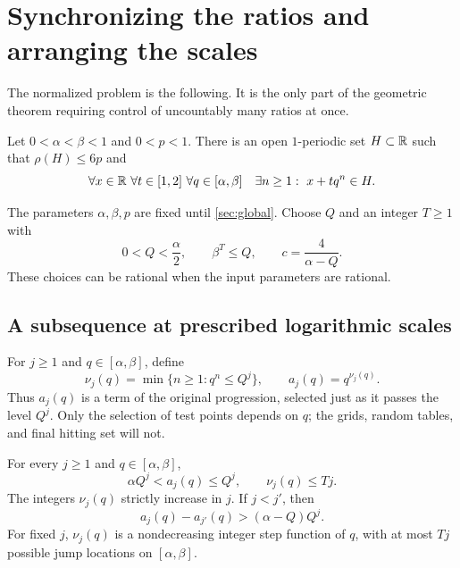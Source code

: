 \section{Synchronizing the ratios and arranging the scales}
\label{sec:synchronization}

The normalized problem is the following. It is the only part of the
geometric theorem requiring control of uncountably many ratios at once.

\begin{proposition}\label{prop:normalized}
Let $0<\alpha<\beta<1$ and $0<p<1$. There is an open $1$-periodic
set $H\subset\mathbb R$ such that $\rho(H)\le6p$ and
\begin{equation}\label{eq:normalized-hit}
 \forall x\in\mathbb R\ \forall t\in[1,2]\ \forall q\in[\alpha,\beta]
 \quad \exists n\ge1:\ x+tq^n\in H.
\end{equation}
\end{proposition}

The parameters $\alpha,\beta,p$ are fixed until \cref{sec:global}.
Choose $Q$ and an integer $T\ge1$ with
\begin{equation}\label{eq:Q-T}
 0<Q<\frac\alpha2,\qquad \beta^T\le Q,
 \qquad c=\frac4{\alpha-Q}.
\end{equation}
These choices can be rational when the input parameters are rational.

\subsection{A subsequence at prescribed logarithmic scales}

For $j\ge1$ and $q\in[\alpha,\beta]$, define
\begin{equation}\label{eq:nu}
 \nu_j(q)=\min\{n\ge1:q^n\le Q^j\},
 \qquad a_j(q)=q^{\nu_j(q)}.
\end{equation}
Thus $a_j(q)$ is a term of the original progression, selected just as it
passes the level $Q^j$. Only the selection of test points depends on $q$;
the grids, random tables, and final hitting set will not.

\begin{lemma}\label{lem:envelopes}
For every $j\ge1$ and $q\in[\alpha,\beta]$,
\begin{equation}\label{eq:envelope}
 \alpha Q^j<a_j(q)\le Q^j,\qquad \nu_j(q)\le Tj.
\end{equation}
The integers $\nu_j(q)$ strictly increase in $j$. If $j<j'$, then
\begin{equation}\label{eq:sample-gap}
 a_j(q)-a_{j'}(q)>(\alpha-Q)Q^j.
\end{equation}
For fixed $j$, $\nu_j(q)$ is a nondecreasing integer step function of $q$,
with at most $Tj$ possible jump locations on $[\alpha,\beta]$.
\end{lemma}

